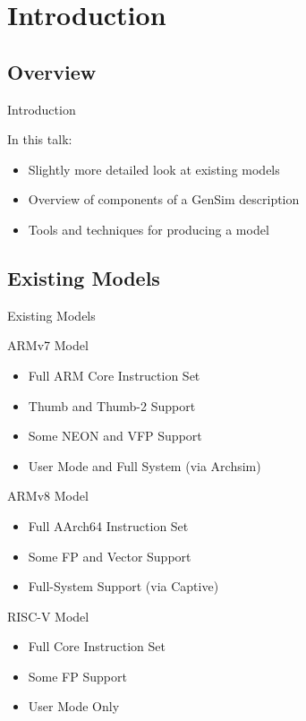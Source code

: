 \section{Introduction}
\subsection{Overview}
\begin{frame}{Introduction}

In this talk:
\begin{itemize}
\item Slightly more detailed look at existing models
\item Overview of components of a GenSim description
\item Tools and techniques for producing a model
\end{itemize}

\end{frame}

\begin{frame}
	\tableofcontents
\end{frame}	

\subsection{Existing Models}

\begin{frame}{Existing Models}

\end{frame}

\begin{frame}{ARMv7 Model}

\begin{itemize}
	\item Full ARM Core Instruction Set
	\item Thumb and Thumb-2 Support
	\item Some NEON and VFP Support
	\item User Mode and Full System (via Archsim)
\end{itemize}

\end{frame}

\begin{frame}{ARMv8 Model}

\begin{itemize}
	\item Full AArch64 Instruction Set
	\item Some FP and Vector Support
	\item Full-System Support (via Captive)
\end{itemize}

\end{frame}

\begin{frame}{RISC-V Model}

\begin{itemize}
	\item Full Core Instruction Set
	\item Some FP Support
	\item User Mode Only
\end{itemize}

\end{frame}
